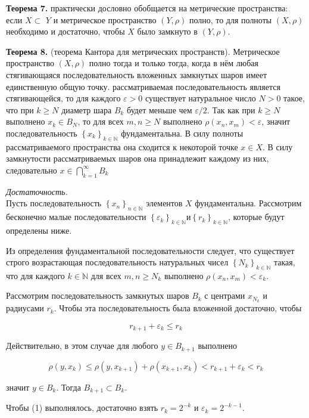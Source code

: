 \documentclass[a4paper,12pt]{article} %
\begin{document}
\textbf{Теорема 7.} практически дословно обобщается на метрические пространства: если $X \subset$ $Y$ и метрическое пространство $(Y, \rho)$ полно, то для полноты $(X, \rho)$ необходимо и достаточно, чтобы $X$ было замкнуто в $(Y, \rho)$.

\textbf{Теорема 8.} (теорема Кантора для метрических пространств). Метрическое пространство $(X, \rho)$ полно тогда и только тогда, когда в нём любая стягивающаяся последовательность вложенных замкнутых шаров имеет единственную общую точку.
рассматриваемая последовательность является стягивающейся, то для каждого $\varepsilon>0$ существует натуральное число $N>0$ такое, что при $k \geq N$ диаметр шара $B_{k}$ будет меньше чем $\varepsilon / 2$. Так как при $k \geq N$ выполнено $x_{k} \in B_{N}$, то для всех $m, n \geq N$ выполнено $\rho\left(x_{n}, x_{m}\right)<\varepsilon$, значит последовательность $\left\{x_{k}\right\}_{k \in \mathbb{N}}$ фундаментальна. В силу полноты рассматриваемого пространства она сходится к некоторой точке $x \in X$. В силу замкнутости рассматриваемых шаров она принадлежит каждому из них, следовательно $x \in \bigcap_{k=1}^{\infty} B_{k}$

\textit{Достаточность.}\\ Пусть последовательность $\left\{x_{n}\right\}_{n \in \mathbb{N}}$ элементов $X$ фундаментальна. Рассмотрим бесконечно малые последовательности $\left\{\varepsilon_{k}\right\}_{k \in \mathbb{N}} и\left\{r_{k}\right\}_{k \in \mathbb{N}}$, которые будут определены ниже.

Из определения фундаментальной последовательности следует, что существует строго возрастающая последовательность натуральных чисел $\left\{N_{k}\right\}_{k \in \mathbb{N}}$ такая, что для каждого $k \in \mathbb{N}$ для всех $m, n \geq N_{k}$ выполнено $\rho\left(x_{n}, x_{m}\right)<\varepsilon_{k}$.

Рассмотрим последовательность замкнутых шаров $B_{k}$ с центрами $x_{N_{k}}$ и радиусами $r_{k}$. Чтобы эта последовательность была вложенной достаточно, чтобы

$$
r_{k+1}+\varepsilon_{k} \leq r_{k}
$$

Действительно, в этом случае для любого $y \in B_{k+1}$ выполнено

$$
\rho\left(y, x_{k}\right) \leq \rho\left(y, x_{k+1}\right)+\rho\left(x_{k+1}, x_{k}\right)<r_{k+1}+\varepsilon_{k}<r_{k}
$$

значит $y \in B_{k}$. Тогда $B_{k+1} \subset B_{k}$.

Чтобы (1) выполнялось, достаточно взять $r_{k}=2^{-k}$ и $\varepsilon_{k}=2^{-k-1}$.
\end{document}
